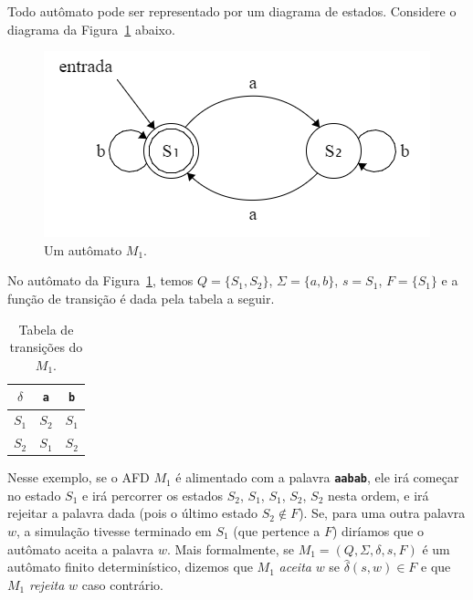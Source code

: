 \documentclass[
	12pt,				%
	openany,
	oneside,
	a4paper,			%
	english,			%
	brazil				%
	]{abntex2}
\begin{document}
  Todo autômato pode ser representado por um diagrama de estados. Considere o diagrama da Figura~\ref{fig:aut01} abaixo.

  \begin{figure}[H]
    \vspace{-0.5cm}
    \centering
    \includegraphics[scale=0.75]{aut01.png}
    \vspace{-0.5cm}
    \caption{Um autômato $M_1$.}
    \label{fig:aut01}
    \vspace{-0.5cm}
  \end{figure}


  No autômato da Figura~\ref{fig:aut01}, temos $Q = \{S_1, S_2\}$, $\Sigma = \{a, b\}$, $s = S_1$, $F = \{S_1\}$ e a função de transição  é dada pela tabela a seguir.
  \begin{table}[H]
    \centering
    \begin{tabular}[H]{c|c c}
      $\delta$ & \textbf{\texttt{a}} & \textbf{\texttt{b}} \\
      \hline
      $S_1$    & $S_2$               & $S_1$               \\
      $S_2$    & $S_1$               & $S_2$
    \end{tabular}
    \caption{Tabela de transições do $M_1$.}
    \label{tab:tabTransicoesM1}
    \vspace{-0.5cm}
  \end{table}


  Nesse exemplo, se o AFD $M_1$ é alimentado com a palavra \textbf{\texttt{aabab}}, ele irá começar no estado $S_1$ e irá percorrer os estados $S_2$, $S_1$, $S_1$, $S_2$, $S_2$ nesta ordem, e irá rejeitar a palavra dada (pois o último estado $S_2 \not\in F$). Se, para uma outra palavra $w$, a simulação tivesse terminado em $S_1$ (que pertence a $F$) diríamos que o autômato aceita a palavra $w$. Mais formalmente, se $M_1 = (Q, \Sigma, \delta, s, F)$ é um autômato finito determinístico, dizemos que $M_1$ \emph{aceita} $w$ se $\hat{\delta}(s, w) \in F$ e que $M_1$ \emph{rejeita} $w$ caso contrário.
\end{document}
